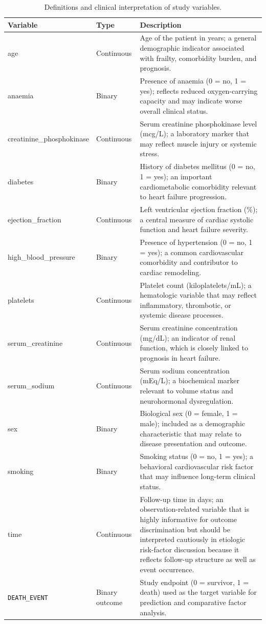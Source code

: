 \begin{table}[htbp]
\centering
\caption{Definitions and clinical interpretation of study variables.}
\label{tab:variable_definitions}
\small
\begin{tabular}{p{3.2cm}p{2.1cm}p{8.6cm}}
\toprule
Variable & Type & Description \\
\midrule
age & Continuous & Age of the patient in years; a general demographic indicator associated with frailty, comorbidity burden, and prognosis. \\
anaemia & Binary & Presence of anaemia (0 = no, 1 = yes); reflects reduced oxygen-carrying capacity and may indicate worse overall clinical status. \\
creatinine\_phosphokinase & Continuous & Serum creatinine phosphokinase level (mcg/L); a laboratory marker that may reflect muscle injury or systemic stress. \\
diabetes & Binary & History of diabetes mellitus (0 = no, 1 = yes); an important cardiometabolic comorbidity relevant to heart failure progression. \\
ejection\_fraction & Continuous & Left ventricular ejection fraction (\%); a central measure of cardiac systolic function and heart failure severity. \\
high\_blood\_pressure & Binary & Presence of hypertension (0 = no, 1 = yes); a common cardiovascular comorbidity and contributor to cardiac remodeling. \\
platelets & Continuous & Platelet count (kiloplatelets/mL); a hematologic variable that may reflect inflammatory, thrombotic, or systemic disease processes. \\
serum\_creatinine & Continuous & Serum creatinine concentration (mg/dL); an indicator of renal function, which is closely linked to prognosis in heart failure. \\
serum\_sodium & Continuous & Serum sodium concentration (mEq/L); a biochemical marker relevant to volume status and neurohormonal dysregulation. \\
sex & Binary & Biological sex (0 = female, 1 = male); included as a demographic characteristic that may relate to disease presentation and outcome. \\
smoking & Binary & Smoking status (0 = no, 1 = yes); a behavioral cardiovascular risk factor that may influence long-term clinical status. \\
time & Continuous & Follow-up time in days; an observation-related variable that is highly informative for outcome discrimination but should be interpreted cautiously in etiologic risk-factor discussion because it reflects follow-up structure as well as event occurrence. \\
\texttt{DEATH\_EVENT} & Binary outcome & Study endpoint (0 = survivor, 1 = death) used as the target variable for prediction and comparative factor analysis. \\
\bottomrule
\end{tabular}
\end{table}
